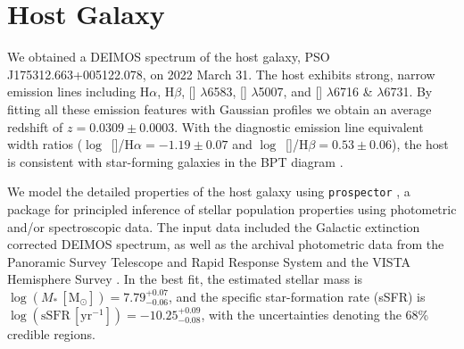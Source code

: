 \documentclass[twocolumn]{aastex631}
\begin{document}
\section{Host Galaxy} \label{sec:host}
We obtained a DEIMOS spectrum of the host galaxy, PSO J175312.663+005122.078, on 2022 March 31. The host exhibits strong, narrow emission lines including H$\alpha$, H$\beta$, [] $\lambda$6583, [] $\lambda$5007, and [] $\lambda$6716 \& $\lambda$6731. By fitting all these emission features with Gaussian profiles we obtain an average redshift of $z=0.0309\pm0.0003$. With the diagnostic emission line equivalent width ratios ($\log$~[]/H$\alpha=-1.19\pm0.07$ and $\log$~[]/H$\beta=0.53\pm0.06$), the host is consistent with star-forming galaxies in the BPT diagram \citep{BPT_1981, Veilleux_1987}. 

We model the detailed properties of the host galaxy using \texttt{prospector} \citep{Johnson_prospector_2021}, a package for principled inference of stellar population properties using photometric and/or spectroscopic data. The input data included the Galactic extinction corrected DEIMOS spectrum, as well as the archival photometric data from the Panoramic Survey Telescope and Rapid Response System \citep[Pan-STARRS;][{\it r, i, z} Kron magnitudes]{PS1_2016}  and the VISTA Hemisphere Survey \citep[VHS;][J and $\mathrm{K}_\mathrm{s}$ Petrosian magnitudes]{VHS_2013}. In the best fit, the estimated stellar mass is $\log (M_*\,[\mathrm{M_\odot}])=7.79_{-0.06}^{+0.07}$, and the specific star-formation rate (sSFR) is $\log (\mathrm{sSFR}\,[\mathrm{yr}^{-1}])=-10.25_{-0.08}^{+0.09}$, with the uncertainties denoting the 68\% credible regions.
\end{document}
